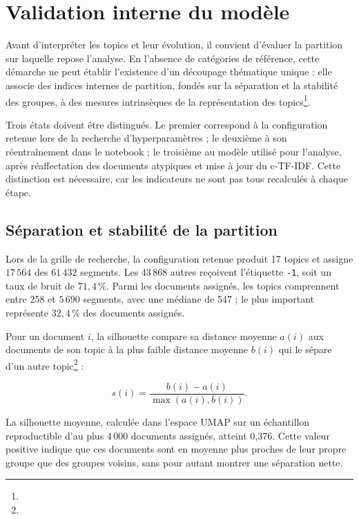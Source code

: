 \section{Validation interne du modèle}

Avant d'interpréter les topics et leur évolution, il convient d'évaluer la partition sur laquelle repose l'analyse. En l'absence de catégories de référence, cette démarche ne peut établir l'existence d'un découpage thématique unique : elle associe des indices internes de partition, fondés sur la séparation et la stabilité des groupes, à des mesures intrinsèques de la représentation des topics\footnote{}.

Trois états doivent être distingués. Le premier correspond à la configuration retenue lors de la recherche d'hyperparamètres ; le deuxième à son réentraînement dans le notebook  ; le troisième au modèle utilisé pour l'analyse, après réaffectation des documents atypiques et mise à jour du c-TF-IDF. Cette distinction est nécessaire, car les indicateurs ne sont pas tous recalculés à chaque étape.

\subsection{Séparation et stabilité de la partition}

Lors de la grille de recherche, la configuration retenue produit 17 topics et assigne \(17\,564\) des \(61\,432\) segments. Les \(43\,868\) autres reçoivent l'étiquette \texttt{-1}, soit un taux de bruit de \(71{,}4\,\%\). Parmi les documents assignés, les topics comprennent entre 258 et \(5\,690\) segments, avec une médiane de 547 ; le plus important représente \(32{,}4\,\%\) des documents assignés.

Pour un document \(i\), la silhouette compare sa distance moyenne \(a(i)\) aux documents de son topic à la plus faible distance moyenne \(b(i)\) qui le sépare d'un autre topic\footnote{} :

\[
s(i)=\frac{b(i)-a(i)}
{\max\left(a(i),b(i)\right)}.
\]

La silhouette moyenne, calculée dans l'espace UMAP sur un échantillon reproductible d'au plus \(4\,000\) documents assignés, atteint 0,376. Cette valeur positive indique que ces documents sont en moyenne plus proches de leur propre groupe que des groupes voisins, sans pour autant montrer une séparation nette.

